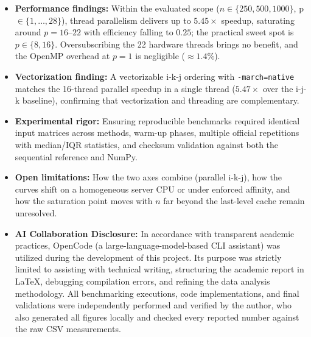 \documentclass[12pt,a4paper]{article}
\begin{document}
\begin{itemize}
\item \textbf{Performance findings:} Within the evaluated scope
($n \in \{250, 500, 1000\}$, p $\in \{1, \dots, 28\}$), thread parallelism
delivers up to $5.45\times$ speedup, saturating around $p = 16$--$22$ with
efficiency falling to $0.25$; the practical sweet spot is
$p \in \{8, 16\}$. Oversubscribing the 22 hardware threads brings no
benefit, and the OpenMP overhead at $p = 1$ is negligible ($\approx
1.4\%$).
\item \textbf{Vectorization finding:} A vectorizable i-k-j ordering with
\texttt{-march=native} matches the 16-thread parallel speedup in a single
thread ($5.47\times$ over the i-j-k baseline), confirming that
vectorization and threading are complementary.
\item \textbf{Experimental rigor:} Ensuring reproducible benchmarks
required identical input matrices across methods, warm-up phases, multiple
official repetitions with median/IQR statistics, and checksum validation
against both the sequential reference and NumPy.
\item \textbf{Open limitations:} How the two axes combine (parallel i-k-j),
how the curves shift on a homogeneous server CPU or under enforced
affinity, and how the saturation point moves with $n$ far beyond the
last-level cache remain unresolved.
\item \textbf{AI Collaboration Disclosure:} In accordance with transparent
academic practices, OpenCode (a large-language-model-based CLI assistant)
was utilized during the development of this project. Its purpose was
strictly limited to assisting with technical writing, structuring the
academic report in LaTeX, debugging compilation errors, and refining the
data analysis methodology. All benchmarking executions, code
implementations, and final validations were independently performed and
verified by the author, who also generated all figures locally and checked
every reported number against the raw CSV measurements.
\end{itemize}
\end{document}
